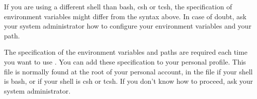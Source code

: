 If you are using a different shell than bash, csh or tcsh, the
specification of environment variables might differ from the syntax
above.  In case of doubt, ask your system administrator how to
configure your environment variables and your path.

The specification of the environment variables and paths are required
each time you want to use \RSAT. You can add these specification to
your personal profile.  This file is normally found at the root of
your personal account, in the file  if your shell is
bash, or  if your shell is csh or tcsh. If you don't know
how to proceed, ask your system administrator.



